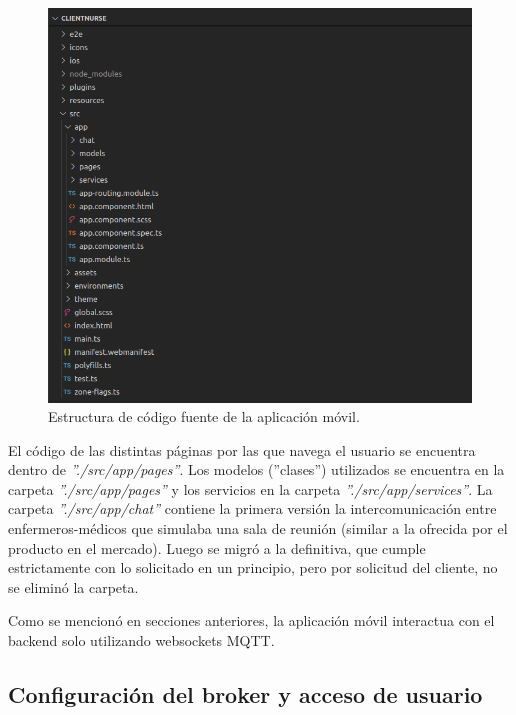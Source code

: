 \begin{figure}[ht]
	\centering
	\includegraphics[scale=.70]{./Figures/app/estructura-app.png}
	\caption{ Estructura de código fuente de la aplicación móvil.}
	\label{fig: Estructura de código fuente de la aplicación móvil.}
\end{figure} 

El código de las distintas páginas por las que navega el usuario se encuentra dentro de \textit{''./src/app/pages''}. Los modelos (''clases'') utilizados se encuentra en la carpeta \textit{''./src/app/pages''} y los servicios en la carpeta \textit{''./src/app/services''}. La carpeta \textit{''./src/app/chat''} contiene la primera versión la intercomunicación entre enfermeros-médicos que simulaba una sala de reunión (similar a la ofrecida por el producto en el mercado). Luego se migró a la definitiva, que cumple estrictamente con lo solicitado en un principio, pero por solicitud del cliente, no se eliminó la carpeta.

Como se mencionó en secciones anteriores, la aplicación móvil interactua con el backend solo utilizando websockets MQTT. 

\pagebreak

\subsection{Configuración del broker y acceso de usuario}

